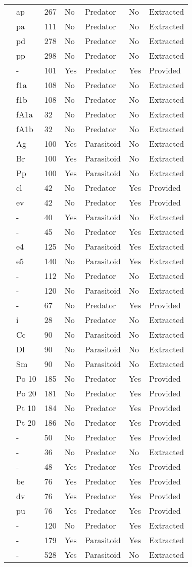 \begin{longtable}{lllllll}
\citet{Eveleigh:1982aa}&ap&267&No&Predator&No&Extracted\tabularnewline
\citet{Eveleigh:1982aa}&pa&111&No&Predator&No&Extracted\tabularnewline
\citet{Eveleigh:1982aa}&pd&278&No&Predator&No&Extracted\tabularnewline
\citet{Eveleigh:1982aa}&pp&298&No&Predator&No&Extracted\tabularnewline
\citet{Fussmann:2005aa}&-&101&Yes&Predator&Yes&Provided\tabularnewline
\citet{Griffen:2007aa}&f1a&108&No&Predator&No&Extracted\tabularnewline
\citet{Griffen:2007aa}&f1b&108&No&Predator&No&Extracted\tabularnewline
\citet{Griffen:2007aa}&fA1a&32&No&Predator&No&Extracted\tabularnewline
\citet{Griffen:2007aa}&fA1b&32&No&Predator&No&Extracted\tabularnewline
\citet{Hassan:1976aa}&Ag&100&Yes&Parasitoid&No&Extracted\tabularnewline
\citet{Hassan:1976aa}&Br&100&Yes&Parasitoid&No&Extracted\tabularnewline
\citet{Hassan:1976aa}&Pp&100&Yes&Parasitoid&No&Extracted\tabularnewline
\citet{Hossie:2016aa}&cl&42&No&Predator&Yes&Provided\tabularnewline
\citet{Hossie:2016aa}&ev&42&No&Predator&Yes&Provided\tabularnewline
\citet{Huffaker:1982aa}&-&40&Yes&Parasitoid&No&Extracted\tabularnewline
\citet{Johnson:2006aa}&-&45&No&Predator&Yes&Extracted\tabularnewline
\citet{Jones:1988aa}&e4&125&No&Parasitoid&Yes&Extracted\tabularnewline
\citet{Jones:1988aa}&e5&140&No&Parasitoid&Yes&Extracted\tabularnewline
\citet{Katz:1985ai}&-&112&No&Predator&No&Extracted\tabularnewline
\citet{Kfir:1983aa}&-&120&No&Parasitoid&No&Extracted\tabularnewline
\citet{Kratina:2009aa}&-&67&No&Predator&Yes&Provided\tabularnewline
\citet{Krylov:1992aa}&i&28&No&Predator&No&Extracted\tabularnewline
\citet{Kumar:1985aa}&Cc&90&No&Parasitoid&No&Extracted\tabularnewline
\citet{Kumar:1985aa}&Dl&90&No&Parasitoid&No&Extracted\tabularnewline
\citet{Kumar:1985aa}&Sm&90&No&Parasitoid&No&Extracted\tabularnewline
\citet{Lang:2012aa}&Po 10&185&No&Predator&Yes&Provided\tabularnewline
\citet{Lang:2012aa}&Po 20&181&No&Predator&Yes&Provided\tabularnewline
\citet{Lang:2012aa}&Pt 10&184&No&Predator&Yes&Provided\tabularnewline
\citet{Lang:2012aa}&Pt 20&186&No&Predator&Yes&Provided\tabularnewline
\citet{Long:2012aa}&-&50&No&Predator&Yes&Provided\tabularnewline
\citet{Mansour:1991aa}&-&36&No&Predator&No&Extracted\tabularnewline
\citet{Medoc:2013aa}&-&48&Yes&Predator&Yes&Provided\tabularnewline
\citet{Medoc:2015aa}&be&76&Yes&Predator&Yes&Provided\tabularnewline
\citet{Medoc:2015aa}&dv&76&Yes&Predator&Yes&Provided\tabularnewline
\citet{Medoc:2015aa}&pu&76&Yes&Predator&Yes&Provided\tabularnewline
\citet{Mertz:1968aa}&-&120&No&Predator&Yes&Extracted\tabularnewline
\citet{Mills:2004aa}&-&179&Yes&Parasitoid&Yes&Extracted\tabularnewline
\citet{Montoya:2000aa}&-&528&Yes&Parasitoid&No&Extracted\tabularnewline

\end{longtable}
